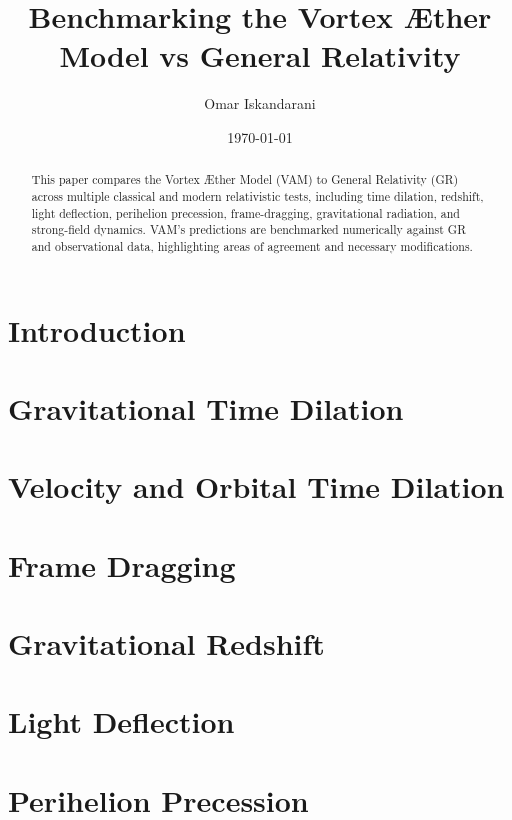 \documentclass{article}
\author{Omar Iskandarani}
\title{Benchmarking the Vortex Æther Model vs General Relativity}
\date{\today}
\affiliation{Independent Researcher, Groningen, The Netherlands}
\begin{document}
\maketitle

\begin{abstract}
This paper compares the Vortex Æther Model (VAM) to General Relativity (GR) across multiple classical and modern relativistic tests, including time dilation, redshift, light deflection, perihelion precession, frame-dragging, gravitational radiation, and strong-field dynamics. VAM’s predictions are benchmarked numerically against GR and observational data, highlighting areas of agreement and necessary modifications.
\end{abstract}

\section{Introduction}


\section{Gravitational Time Dilation}


\section{Velocity and Orbital Time Dilation}


\section{Frame Dragging}


\section{Gravitational Redshift}


\section{Light Deflection}

\section{Perihelion Precession}

\end{document}
